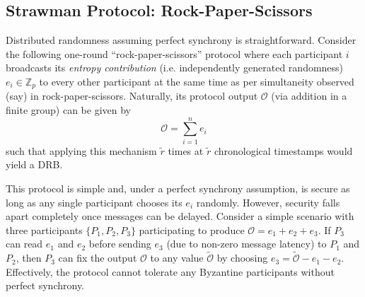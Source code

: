 \documentclass[conference]{IEEEtran}
\theoremstyle{definition}
\theoremstyle{remark}
\newcommand{\joenote}[1]{\textcolor{blue}{\textbf{JOE:} #1}}
\begin{document}
\subsection{Strawman Protocol: Rock-Paper-Scissors}
Distributed randomness assuming perfect synchrony is straightforward. Consider the following one-round ``rock-paper-scissors'' protocol where each participant $i$ broadcasts its \textit{entropy contribution} (i.e. independently generated randomness) $e_i \in \mathbb{Z}_p$ to every other participant at the same time as per simultaneity observed (say) in rock-paper-scissors. Naturally, its protocol output $\mathcal{O}$ (via addition in a finite group) can be given by
\[
\mathcal{O} = \sum_{i = 1}^n e_i
\]
such that applying this mechanism $\tilde{r}$ times at $\tilde{r}$ chronological timestamps would yield a DRB.

This protocol is simple and, under a perfect synchrony assumption, is secure as long as any single participant chooses its $e_i$ randomly. However, security falls apart completely once messages can be delayed.
Consider a simple scenario with three participants $\{P_1, P_2, P_3\}$ participating to produce $\mathcal{O} = e_1 + e_2 + e_3$. If $P_3$ can read $e_1$ and $e_2$ before sending $e_3$ (due to non-zero message latency) to $P_1$ and $P_2$, then $P_3$ can fix the output $\mathcal{O}$ to any value $\tilde{\mathcal{O}}$ by choosing $e_3 = \tilde{\mathcal{O}} - e_1 - e_2$. Effectively, the protocol cannot tolerate any Byzantine participants without perfect synchrony.
\end{document}
